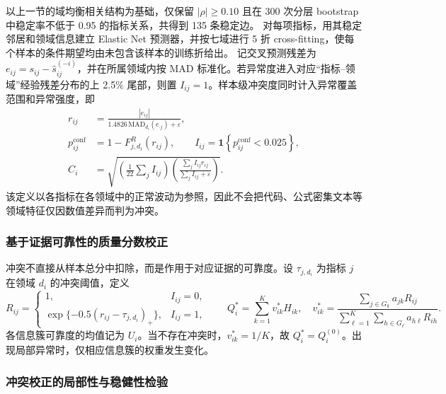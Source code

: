 \documentclass[bwprint]{gmcmthesis}
\begin{document}
以上一节的域均衡相关结构为基础，仅保留 $|\rho|\ge0.10$ 且在 300 次分层 bootstrap 中稳定率不低于 0.95 的指标关系，共得到 135 条稳定边。
对每项指标，用其稳定邻居和领域信息建立 Elastic Net 预测器，并按七域进行 5 折 cross-fitting，使每个样本的条件期望均由未包含该样本的训练折给出。
记交叉预测残差为 $e_{ij}=s_{ij}-\widehat s_{ij}^{(-i)}$，并在所属领域内按 MAD 标准化。若异常度进入对应“指标--领域”经验残差分布的上 2.5\% 尾部，则置 $I_{ij}=1$。样本级冲突度同时计入异常覆盖范围和异常强度，即
\begin{equation}
    \begin{aligned}
        r_{ij}                 & =\frac{|e_{ij}|}{1.4826\,\mathrm{MAD}_{d_i}(e_{\cdot j})+\varepsilon}, \\
        p_{ij}^{\mathrm{conf}} & =1-F_{j,d_i}^{R}(r_{ij}),\qquad
        I_{ij}=\mathbf{1}\!\left\{p_{ij}^{\mathrm{conf}}<0.025\right\},                                 \\
        C_i                    & =\sqrt{\left(\frac{1}{22}\sum_j I_{ij}\right)
            \left(\frac{\sum_j I_{ij}r_{ij}}{\sum_j I_{ij}+\varepsilon}\right)}.
    \end{aligned}
    \label{eq:q1_conflict}
\end{equation}
该定义以各指标在各领域中的正常波动为参照，因此不会把代码、公式密集文本等领域特征仅因数值差异而判为冲突。

\subsubsection{基于证据可靠性的质量分数校正}

冲突不直接从样本总分中扣除，而是作用于对应证据的可靠度。设 $\tau_{j,d_i}$ 为指标 $j$ 在领域 $d_i$ 的冲突阈值，定义
\begin{equation}
    R_{ij}=\begin{cases}
        1,                                   & I_{ij}=0, \\
        \exp\{-0.5(r_{ij}-\tau_{j,d_i})_+\}, & I_{ij}=1,
    \end{cases}
    \qquad
    Q_i^*=\sum_{k=1}^{K}v_{ik}^*H_{ik},\quad
    v_{ik}^*=\frac{\sum_{j\in G_k}a_{jk}R_{ij}}
    {\sum_{\ell=1}^{K}\sum_{h\in G_\ell}a_{h\ell}R_{ih}}.
    \label{eq:q1_qstar}
\end{equation}
各信息簇可靠度的均值记为 $U_i$。当不存在冲突时，$v_{ik}^*=1/K$，故 $Q_i^*=Q_i^{(0)}$。出现局部异常时，仅相应信息簇的权重发生变化。

\subsubsection{冲突校正的局部性与稳健性检验}
\end{document}
